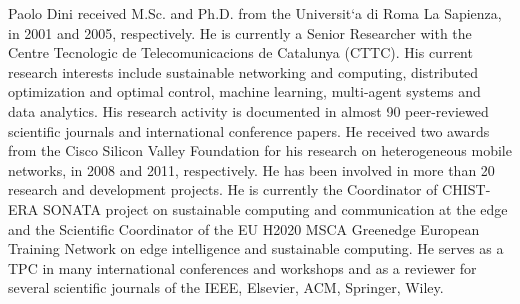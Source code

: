 \documentclass[10pt,journal,compsoc]{IEEEtran}
\begin{document}

\vspace{-1cm}
\begin{IEEEbiography}{Paolo Dini} received M.Sc. and Ph.D. from the Universit`a di Roma La Sapienza, in 2001 and 2005, respectively. He is currently a Senior Researcher with the Centre Tecnologic de Telecomunicacions de Catalunya (CTTC). His current research interests include sustainable networking and computing, distributed optimization and optimal control, machine learning, multi-agent systems and data analytics. His research activity is documented in almost 90 peer-reviewed scientific journals and international conference papers. He received two awards from the Cisco Silicon Valley Foundation for his research on heterogeneous mobile networks, in 2008 and 2011, respectively. He has been involved in more than 20 research and development projects. He is currently the Coordinator of CHIST-ERA SONATA project on sustainable computing and communication at the edge and the Scientific Coordinator of the EU H2020 MSCA Greenedge European Training Network on edge intelligence and sustainable computing. He serves as a TPC in many international conferences and workshops and as a reviewer for several scientific journals of the IEEE, Elsevier, ACM, Springer, Wiley.
\end{IEEEbiography}






\end{document}
